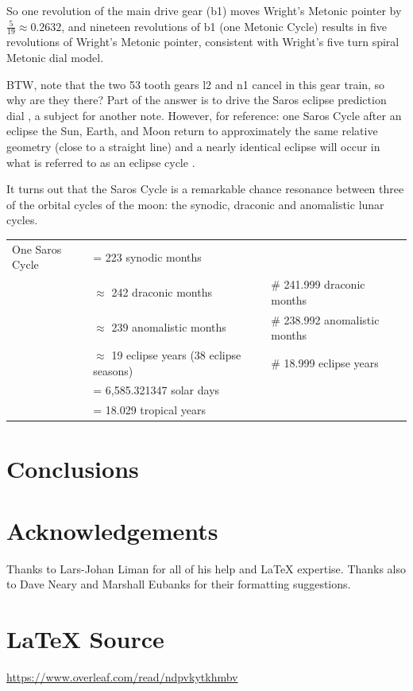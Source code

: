 \documentclass{article}
\theoremstyle{definition}
\begin{document}
\bigskip
\bigskip
\noindent
So one revolution of the main drive gear (b1) moves Wright's
Metonic pointer by $\frac{5}{19} \approx 0.2632$, and nineteen
revolutions of b1 (one Metonic Cycle) results in five revolutions
of Wright's Metonic pointer, consistent with Wright's five turn
spiral Metonic dial model.


\bigskip
\noindent
BTW, note that the two 53 tooth gears l2 and n1 cancel in this
gear train, so why are they there?  Part of the answer is to
drive the Saros eclipse prediction dial \cite{pmid25075747}, a
subject for another note.  However, for reference: one Saros
Cycle after an eclipse the Sun, Earth, and Moon return to
approximately the same relative geometry (close to a straight
line) and a nearly identical eclipse will occur in what is
referred to as an eclipse cycle \cite{wiki:saros}.

\bigskip
\noindent
It turns out that the Saros Cycle is a remarkable chance
resonance between three of the orbital cycles of the moon: the
synodic, draconic and anomalistic lunar cycles.

\begin{flushleft}
\begin{tabular}{@{}l@{\ }l@{\qquad}l}
  One Saros Cycle
  & = 223 synodic months \\
  & $\approx$ 242 draconic months                       &\# 241.999 draconic months \\
  & $\approx$ 239 anomalistic months                    & \# 238.992 anomalistic months \\
  & $\approx$ 19 eclipse years (38 eclipse seasons)     & \# 18.999 eclipse years \\
  & = 6,585.321347 solar days \\
  & = 18.029  tropical years            
\end{tabular}
\end{flushleft}
%
%
%
\section{Conclusions}
%
%
%
\section*{Acknowledgements}
Thanks to Lars-Johan Liman for all of his help and \LaTeX
expertise. Thanks also to Dave Neary and Marshall Eubanks for
their formatting suggestions. 
%
%
\section*{\LaTeX \hspace{0.10 mm} Source}
\url{https://www.overleaf.com/read/ndpvkytkhmbv}
%
%
%


%
%
\end{document}
